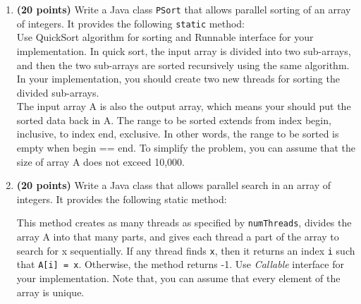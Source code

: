 \documentclass[11pt]{article}
\newcounter{problem}
\begin{document}
\begin{enumerate}
\item \textbf{(20 points)} Write a Java class \texttt{PSort} that allows
  parallel sorting of an array of integers. It provides the following
  \texttt{static} method: \\



  Use QuickSort algorithm for sorting and Runnable interface for your
  implementation. In quick sort, the input array is divided into two sub-arrays,
  and then the two sub-arrays are sorted recursively using the same
  algorithm. In your implementation, you should create two new threads for
  sorting the divided
  sub-arrays. \\

  The input array A is also the output array, which means your should put the
  sorted data back in A.  The range to be sorted extends from index begin,
  inclusive, to index end, exclusive. In other words, the range to be sorted is
  empty when begin == end. To simplify the problem, you can assume that the size
  of array A does not exceed 10,000.

\item \textbf{(20 points)} Write a Java class that allows parallel search in an
  array of integers. It provides the following static method:



  This method creates as many threads as specified by \texttt{numThreads},
  divides the array A into that many parts, and gives each thread a part of the
  array to search for x sequentially. If any thread finds \texttt{x}, then it
  returns an index \texttt{i} such that \texttt{A[i] = x}. Otherwise, the method
  returns -1. Use \emph{Callable} interface for your implementation. Note that,
  you can assume that every element of the array is unique.


\end{enumerate}
\end{document}
